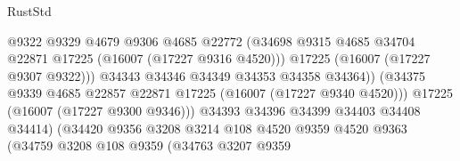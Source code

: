 \begin{lexlean}{RustStd}
\begin{coremodule}
                                              @9322
                                              @9329
                                              @4679
                                              @9306
                                              @4685
                                              @22772
                                              (@34698
                                                @9315
                                                @4685
                                                @34704
                                                @22871
                                                @17225
                                                (@16007 (@17227 @9316 @4520)))
                                              @17225
                                              (@16007 (@17227 @9307 @9322)))
                                            @34343
                                            @34346
                                            @34349
                                            @34353
                                            @34358
                                            @34364))
                                        (@34375
                                          @9339
                                          @4685
                                          @22857
                                          @22871
                                          @17225
                                          (@16007 (@17227 @9340 @4520)))
                                        @17225
                                        (@16007 (@17227 @9300 @9346)))
                                      @34393
                                      @34396
                                      @34399
                                      @34403
                                      @34408
                                      @34414)
                                    (@34420
                                      @9356
                                      @3208
                                      @3214
                                      @108
                                      @4520
                                      @9359
                                      @4520
                                      @9363
                                      (@34759
                                        @3208
                                        @108
                                        @9359
                                        (@34763
                                          @3207
                                          @9359

\end{coremodule}
\end{lexlean}
